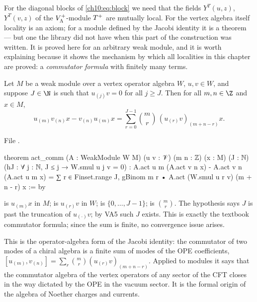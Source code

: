 For the diagonal blocks of \eqref{ch10:eq:block} we need that the fields $Y^T(u,z)$, $Y^T(v,z)$ of
the $V_{\Lambda}^{+}$-module $T^{+}$ are mutually local.  For the vertex algebra itself locality is an
axiom; for a module defined by the Jacobi identity it is a theorem --- but one the library did
not have when this part of the construction was written.  It is proved here for an arbitrary
weak module, and it is worth explaining because it shows the mechanism by which all localities in
this chapter are proved: a \emph{commutator formula} with finitely many terms.

\begin{theorem}\label{ch10:thm:actcomm}
Let $M$ be a weak module over a vertex operator algebra $W$, $u,v\in W$, and suppose $J\in\N$ is
such that $u_{(j)}v=0$ for all $j\ge J$.  Then for all $m,n\in\Z$ and $x\in M$,
\begin{equation*}
  u_{(m)}v_{(n)}x-v_{(n)}u_{(m)}x=\sum_{r=0}^{J-1}\binom mr\,(u_{(r)}v)_{(m+n-r)}x .
\end{equation*}
\end{theorem}
\noindent File .
\begin{leancode}
theorem act_comm (A : WeakModule W M) (u v : 𝒱) (m n : ℤ) (x : M) (J : ℕ)
    (hJ : ∀ j : ℕ, J ≤ j → W.smul u j v = 0) :
    A.act u m (A.act v n x) - A.act v n (A.act u m x)
      = ∑ r ∈ Finset.range J, gBinom m r • A.act (W.smul u r v) (m + n - r) x := by
\end{leancode}
\begin{dictionary}
 is $u_{(m)}x$ in $M$;  is $u_{(r)}v$ in $W$;
 is $\{0,\dots,J-1\}$;  is $\binom mr$.  The hypothesis
 says $J$ is past the truncation of $u_{(\cdot)}v$; by VA5 such $J$ exists.  This is
exactly the textbook commutator formula; since the sum is finite, no convergence issue arises.
\end{dictionary}

\begin{physics}
This is the operator-algebra form of the Jacobi identity: the commutator of two modes of a chiral algebra is a finite sum of modes of the OPE coefficients, $[u_{(m)},v_{(n)}]=\sum_r\binom mr(u_{(r)}v)_{(m+n-r)}$. Applied to modules it says that the commutator algebra of the vertex operators of any sector of the CFT closes in the way dictated by the OPE in the vacuum sector. It is the formal origin of the algebra of Noether charges and currents.
\end{physics}

